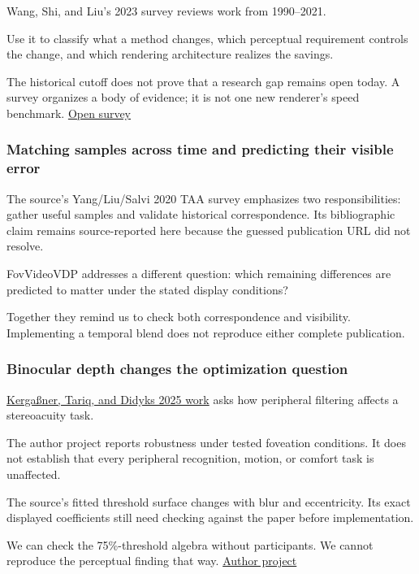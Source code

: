 Wang, Shi, and Liu's 2023 survey reviews work from 1990--2021.

Use it to classify what a method changes, which perceptual requirement controls the change, and which rendering architecture realizes the savings.

The historical cutoff does not prove that a research gap remains open today. A survey organizes a body of evidence; it is not one new renderer's speed benchmark. \href{https://link.springer.com/article/10.1007/s41095-022-0306-4}{Open survey}

\subsubsection{Matching samples across time and predicting their visible error}\label{04-visual-computing-ii-ch043-matching-samples-across-time-and-predicting-their-visible-error}

The source's Yang/Liu/Salvi 2020 TAA survey emphasizes two responsibilities: gather useful samples and validate historical correspondence. Its bibliographic claim remains source-reported here because the guessed publication URL did not resolve.

FovVideoVDP addresses a different question: which remaining differences are predicted to matter under the stated display conditions?

Together they remind us to check both correspondence and visibility. Implementing a temporal blend does not reproduce either complete publication.

\subsubsection{Binocular depth changes the optimization question}\label{04-visual-computing-ii-ch043-binocular-depth-changes-the-optimization-question}

\hyperref[appendix-8dc848f14052]{Kergaßner, Tariq, and Didyk\textquotesingle s 2025 work} asks how peripheral filtering affects a stereoacuity task.

The author project reports robustness under tested foveation conditions. It does not establish that every peripheral recognition, motion, or comfort task is unaffected.

The source's fitted threshold surface changes with blur and eccentricity. Its exact displayed coefficients still need checking against the paper before implementation.

We can check the 75\%-threshold algebra without participants. We cannot reproduce the perceptual finding that way. \href{https://sophie-kergassner.github.io/depth-in-periphery.html}{Author project}

